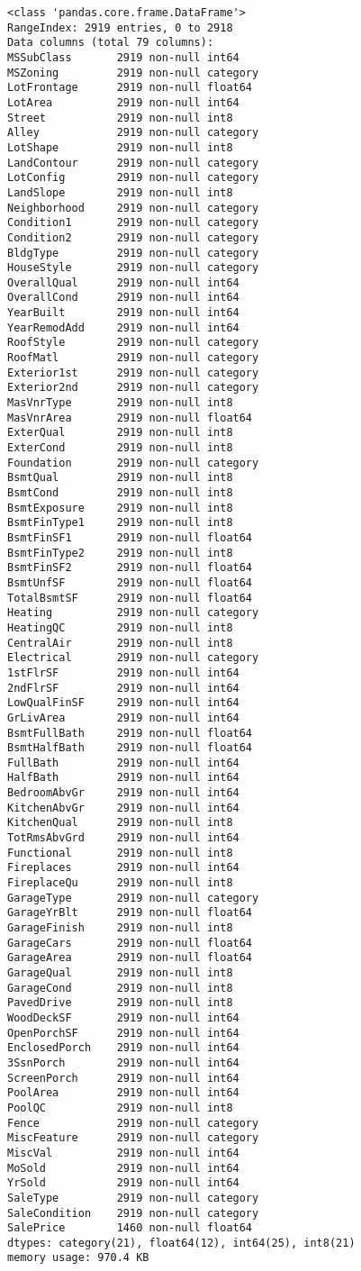 \documentclass[11pt]{article}
\begin{document}
    \begin{Verbatim}[commandchars=\\\{\}]
<class 'pandas.core.frame.DataFrame'>
RangeIndex: 2919 entries, 0 to 2918
Data columns (total 79 columns):
MSSubClass       2919 non-null int64
MSZoning         2919 non-null category
LotFrontage      2919 non-null float64
LotArea          2919 non-null int64
Street           2919 non-null int8
Alley            2919 non-null category
LotShape         2919 non-null int8
LandContour      2919 non-null category
LotConfig        2919 non-null category
LandSlope        2919 non-null int8
Neighborhood     2919 non-null category
Condition1       2919 non-null category
Condition2       2919 non-null category
BldgType         2919 non-null category
HouseStyle       2919 non-null category
OverallQual      2919 non-null int64
OverallCond      2919 non-null int64
YearBuilt        2919 non-null int64
YearRemodAdd     2919 non-null int64
RoofStyle        2919 non-null category
RoofMatl         2919 non-null category
Exterior1st      2919 non-null category
Exterior2nd      2919 non-null category
MasVnrType       2919 non-null int8
MasVnrArea       2919 non-null float64
ExterQual        2919 non-null int8
ExterCond        2919 non-null int8
Foundation       2919 non-null category
BsmtQual         2919 non-null int8
BsmtCond         2919 non-null int8
BsmtExposure     2919 non-null int8
BsmtFinType1     2919 non-null int8
BsmtFinSF1       2919 non-null float64
BsmtFinType2     2919 non-null int8
BsmtFinSF2       2919 non-null float64
BsmtUnfSF        2919 non-null float64
TotalBsmtSF      2919 non-null float64
Heating          2919 non-null category
HeatingQC        2919 non-null int8
CentralAir       2919 non-null int8
Electrical       2919 non-null category
1stFlrSF         2919 non-null int64
2ndFlrSF         2919 non-null int64
LowQualFinSF     2919 non-null int64
GrLivArea        2919 non-null int64
BsmtFullBath     2919 non-null float64
BsmtHalfBath     2919 non-null float64
FullBath         2919 non-null int64
HalfBath         2919 non-null int64
BedroomAbvGr     2919 non-null int64
KitchenAbvGr     2919 non-null int64
KitchenQual      2919 non-null int8
TotRmsAbvGrd     2919 non-null int64
Functional       2919 non-null int8
Fireplaces       2919 non-null int64
FireplaceQu      2919 non-null int8
GarageType       2919 non-null category
GarageYrBlt      2919 non-null float64
GarageFinish     2919 non-null int8
GarageCars       2919 non-null float64
GarageArea       2919 non-null float64
GarageQual       2919 non-null int8
GarageCond       2919 non-null int8
PavedDrive       2919 non-null int8
WoodDeckSF       2919 non-null int64
OpenPorchSF      2919 non-null int64
EnclosedPorch    2919 non-null int64
3SsnPorch        2919 non-null int64
ScreenPorch      2919 non-null int64
PoolArea         2919 non-null int64
PoolQC           2919 non-null int8
Fence            2919 non-null category
MiscFeature      2919 non-null category
MiscVal          2919 non-null int64
MoSold           2919 non-null int64
YrSold           2919 non-null int64
SaleType         2919 non-null category
SaleCondition    2919 non-null category
SalePrice        1460 non-null float64
dtypes: category(21), float64(12), int64(25), int8(21)
memory usage: 970.4 KB


\end{Verbatim}
\end{document}
